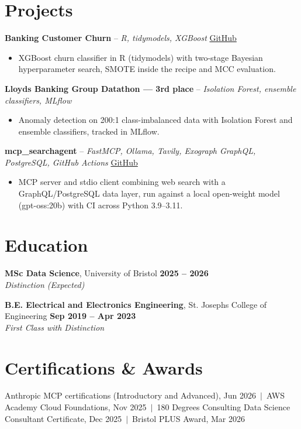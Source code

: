 \documentclass[a4paper,11pt]{article}
\begin{document}
\section{Projects}
\noindent\textbf{Banking Customer Churn} -- \textit{R, tidymodels, XGBoost} \hfill \href{https://github.com/Thiruvel-AP/Banking-Customer-Churn-Prediction}{GitHub}
\begin{itemize}
  \item XGBoost churn classifier in R (tidymodels) with two-stage Bayesian hyperparameter search, SMOTE inside the recipe and MCC evaluation.
\end{itemize}
\vspace{3pt}
\noindent\textbf{Lloyd\textquotesingle{}s Banking Group Datathon — 3rd place} -- \textit{Isolation Forest, ensemble classifiers, MLflow} \hfill 
\begin{itemize}
  \item Anomaly detection on 200:1 class-imbalanced data with Isolation Forest and ensemble classifiers, tracked in MLflow.
\end{itemize}
\vspace{3pt}
\noindent\textbf{mcp\_searchagent} -- \textit{FastMCP, Ollama, Tavily, Exograph GraphQL, PostgreSQL, GitHub Actions} \hfill \href{https://github.com/Thiruvel-AP/mcp_searchagent}{GitHub}
\begin{itemize}
  \item MCP server and stdio client combining web search with a GraphQL/PostgreSQL data layer, run against a local open-weight model (gpt-oss:20b) with CI across Python 3.9–3.11.
\end{itemize}

\section{Education}
\textbf{MSc Data Science}, University of Bristol \hfill \textbf{2025 – 2026}\\ \textit{Distinction (Expected)}\par
\vspace{3pt}
\textbf{B.E. Electrical and Electronics Engineering}, St. Joseph\textquotesingle{}s College of Engineering \hfill \textbf{Sep 2019 – Apr 2023}\\ \textit{First Class with Distinction}\par

\section{Certifications \& Awards}
Anthropic MCP certifications (Introductory and Advanced), Jun 2026 \,$|$\, AWS Academy Cloud Foundations, Nov 2025 \,$|$\, 180 Degrees Consulting Data Science Consultant Certificate, Dec 2025 \,$|$\, Bristol PLUS Award, Mar 2026
\end{document}
